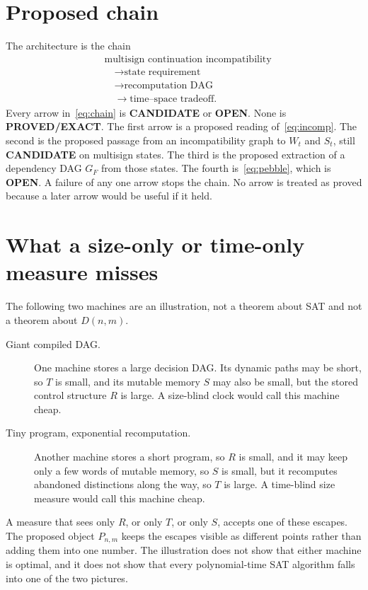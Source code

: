 \documentclass[11pt]{article}
\begin{document}
\section{Proposed chain}
The architecture is the chain
\begin{equation}
\begin{aligned}
&\text{multisign continuation incompatibility}\\
&\quad\rightarrow\text{state requirement}\\
&\quad\rightarrow\text{recomputation DAG}\\
&\quad\rightarrow\text{time--space tradeoff}.
\end{aligned}
\label{eq:chain}
\end{equation}
Every arrow in~\eqref{eq:chain} is \textbf{CANDIDATE} or \textbf{OPEN}.
None is \textbf{PROVED/EXACT}.
The first arrow is a proposed reading of~\eqref{eq:incomp}.
The second is the proposed passage from an incompatibility graph to \(W_t\) and \(S_t\), still \textbf{CANDIDATE} on multisign states.
The third is the proposed extraction of a dependency DAG \(G_F\) from those states.
The fourth is~\eqref{eq:pebble}, which is \textbf{OPEN}.
A failure of any one arrow stops the chain.
No arrow is treated as proved because a later arrow would be useful if it held.

\section{What a size-only or time-only measure misses}
The following two machines are an illustration, not a theorem about SAT and not a theorem about \(D(n,m)\).

\begin{description}
\item[Giant compiled DAG.]
One machine stores a large decision DAG.
Its dynamic paths may be short, so \(T\) is small, and its mutable memory \(S\) may also be small, but the stored control structure \(R\) is large.
A size-blind clock would call this machine cheap.
\item[Tiny program, exponential recomputation.]
Another machine stores a short program, so \(R\) is small, and it may keep only a few words of mutable memory, so \(S\) is small, but it recomputes abandoned distinctions along the way, so \(T\) is large.
A time-blind size measure would call this machine cheap.
\end{description}

A measure that sees only \(R\), or only \(T\), or only \(S\), accepts one of these escapes.
The proposed object \(P_{n,m}\) keeps the escapes visible as different points rather than adding them into one number.
The illustration does not show that either machine is optimal, and it does not show that every polynomial-time SAT algorithm falls into one of the two pictures.
\end{document}
